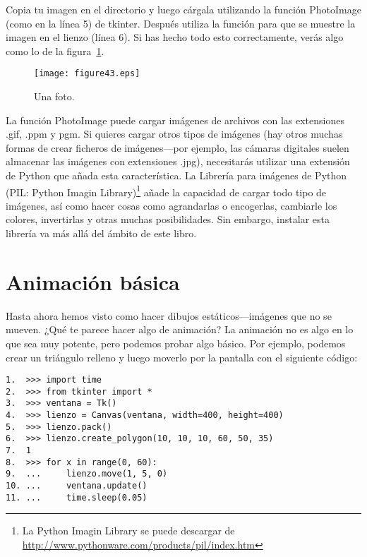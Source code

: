 Copia tu imagen en el directorio y luego cárgala utilizando la función PhotoImage (como en la línea 5) de tkinter. Después utiliza la función  para que se muestre la imagen en el lienzo (línea 6). Si has hecho todo esto correctamente, verás algo como lo de la figura~\ref{fig43}.

\begin{figure}
\begin{center}
\texttt{[image: figure43.eps]}
\end{center}
\caption{Una foto.}\label{fig43}
\end{figure}

La función PhotoImage puede cargar imágenes de archivos con las extensiones .gif, .ppm y pgm. Si quieres cargar otros tipos de imágenes (hay otros muchas formas de crear ficheros de imágenes---por ejemplo, las cámaras digitales suelen almacenar las imágenes con extensiones .jpg), necesitarás utilizar una extensión de Python que añada esta característica.  La Librería para imágenes de Python (PIL: Python Imagin Library)\footnote{La Python Imagin Library se puede descargar de \href{http://www.pythonware.com/products/pil/index.htm}{http://www.pythonware.com/products/pil/index.htm}} añade la capacidad de cargar todo tipo de imágenes, así como hacer cosas como agrandarlas o encogerlas, cambiarle los colores, invertirlas y otras muchas posibilidades. Sin embargo, instalar esta librería va más allá del ámbito de este libro.

\section{Animación básica}

Hasta ahora hemos visto como hacer dibujos estáticos---imágenes que no se mueven.  ¿Qué te parece hacer algo de animación? La animación no es algo en lo que  sea muy potente, pero podemos probar algo básico.  Por ejemplo, podemos crear un triángulo relleno y luego moverlo por la pantalla con el siguiente código:

\begin{listingignore}
\begin{verbatim}
1.  >>> import time
2.  >>> from tkinter import *
3.  >>> ventana = Tk()
4.  >>> lienzo = Canvas(ventana, width=400, height=400)
5.  >>> lienzo.pack()
6.  >>> lienzo.create_polygon(10, 10, 10, 60, 50, 35)
7.  1
8.  >>> for x in range(0, 60):
9.  ...     lienzo.move(1, 5, 0)
10. ...     ventana.update()
11. ...     time.sleep(0.05)
\end{verbatim}
\end{listingignore}

